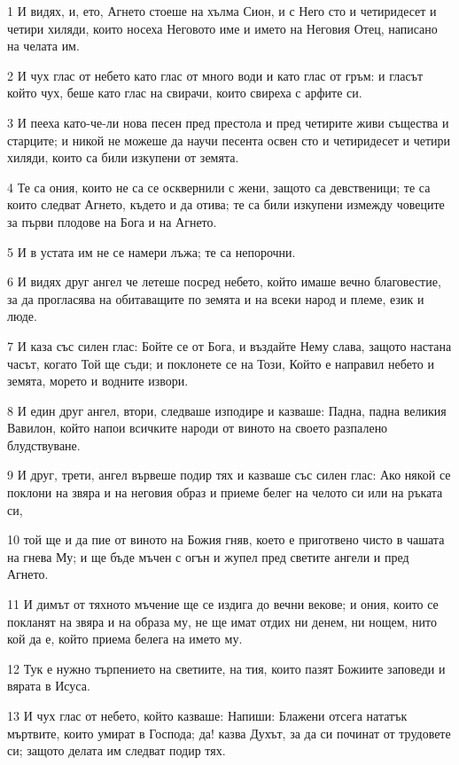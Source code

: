 \par 1 И видях, и, ето, Агнето стоеше на хълма Сион, и с Него сто и четиридесет и четири хиляди, които носеха Неговото име и името на Неговия Отец, написано на челата им.
\par 2 И чух глас от небето като глас от много води и като глас от гръм: и гласът който чух, беше като глас на свирачи, които свиреха с арфите си.
\par 3 И пееха като-че-ли нова песен пред престола и пред четирите живи същества и старците; и никой не можеше да научи песента освен сто и четиридесет и четири хиляди, които са били изкупени от земята.
\par 4 Те са ония, които не са се осквернили с жени, защото са девственици; те са които следват Агнето, където и да отива; те са били изкупени измежду човеците за първи плодове на Бога и на Агнето.
\par 5 И в устата им не се намери лъжа; те са непорочни.
\par 6 И видях друг ангел че летеше посред небето, който имаше вечно благовестие, за да прогласява на обитаващите по земята и на всеки народ и племе, език и люде.
\par 7 И каза със силен глас: Бойте се от Бога, и въздайте Нему слава, защото настана часът, когато Той ще съди; и поклонете се на Този, Който е направил небето и земята, морето и водните извори.
\par 8 И един друг ангел, втори, следваше изподире и казваше: Падна, падна великия Вавилон, който напои всичките народи от виното на своето разпалено блудствуване.
\par 9 И друг, трети, ангел вървеше подир тях и казваше със силен глас: Ако някой се поклони на звяра и на неговия образ и приеме белег на челото си или на ръката си,
\par 10 той ще и да пие от виното на Божия гняв, което е приготвено чисто в чашата на гнева Му; и ще бъде мъчен с огън и жупел пред светите ангели и пред Агнето.
\par 11 И димът от тяхното мъчение ще се издига до вечни векове; и ония, които се покланят на звяра и на образа му, не ще имат отдих ни денем, ни нощем, нито кой да е, който приема белега на името му.
\par 12 Тук е нужно търпението на светиите, на тия, които пазят Божиите заповеди и вярата в Исуса.
\par 13 И чух глас от небето, който казваше: Напиши: Блажени отсега нататък мъртвите, които умират в Господа; да! казва Духът, за да си починат от трудовете си; защото делата им следват подир тях.
